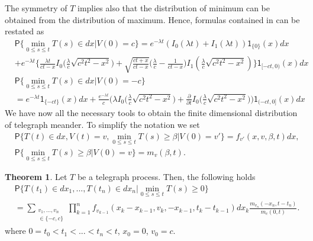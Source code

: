 \documentclass{article}
\theoremstyle{definition}
\newtheorem{theorem}{Theorem}[section]
\numberwithin{equation}{section}
\begin{document}
The symmetry of $T$ implies also that the distribution of minimum can be obtained from the distribution of maximum. Hence, formulas contained in \cite{CO 2021} can be restated as
\begin{align}\label{minimum positive}
&\mathsf{P}\{\min_{0\leq s \leq t}T(s) \in dx |V(0) = c\} = e^{-\lambda t}(I_0(\lambda t)+I_1(\lambda t))\mathsf{1}_{\{0\}}(x)dx \nonumber\\
&+e^{-\lambda t}\bigg\{\frac{\lambda t}{ct-x}I_0\big(\frac{\lambda}{c} \sqrt{c^2t^2 -x^2}\big)+\sqrt{\frac{ct+x}{ct-x}}\Big(\frac{\lambda}{c}-\frac{1}{ct-x}\Big)I_1(\frac{\lambda }{c}\sqrt{c^2t^2 -x^2})\bigg\}\mathsf{1}_{[-ct,0)}(x)dx\\
&\mathsf{P}\{\min_{0\leq s \leq t}T(s) \in dx |V(0) = -c\} \nonumber\\&=e^{-\lambda t}\mathsf{1}_{\{-ct\}}(x)dx +\frac{e^{-\lambda t}}{c}\Big(\lambda I_0\big(\frac{\lambda}{c}\sqrt{c^2t^2-x^2}\big)+\frac{\partial}{\partial t}I_0\big(\frac{\lambda}{c}\sqrt{c^2t^2-x^2})\Big)\mathsf{1}_{(-ct,0]}(x)dx\label{minimum negative}
\end{align}
We have now all the necessary tools to obtain the finite dimensional distribution of telegraph meander. To simplify the notation we set
\begin{align}\label{notation 1}
&\mathsf{P}\{T(t) \in dx,V(t) =v,\min_{0\leq s\leq t}T(s) \geq \beta|V(0) = v'\} = f_{v'}(x,v,\beta,t)dx,\\
&\mathsf{P}\{\min_{0\leq s\leq t}T(s) \geq \beta|V(0) = v\} = m_{v}(\beta,t).\label{notation 2}
\end{align}
\begin{theorem}
Let $T$ be a telegraph process. Then, the following holds
\begin{align}\label{fdd}
&\mathsf{P}\{T(t_1) \in dx_1,...,T(t_n) \in dx_n|\min_{0\leq s\leq t}T(s) \geq 0\}\nonumber\\
&=\sum_{\substack{v_1,...,v_n\\\in \{-c,c\}}}\prod_{k=1}^nf_{v_{k-1}}(x_k-x_{k-1},v_k,-x_{k-1},t_k-t_{k-1})dx_k\frac{m_{v_n}(-x_n,t-t_n)}{m_c(0,t)}. 
\end{align}
where $0=t_0<t_1<...<t_n<t$, $x_0 = 0$, $v_0 = c$.
\end{theorem}
\end{document}
